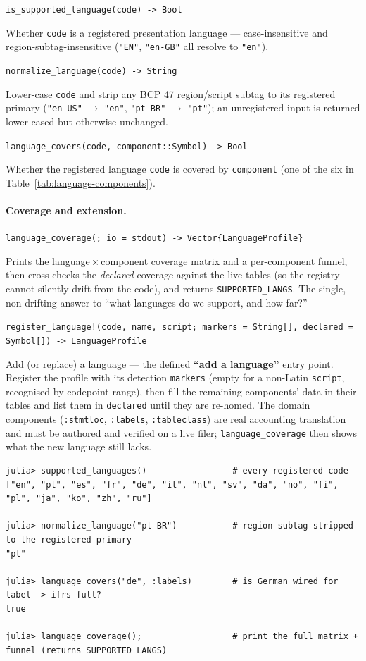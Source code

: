 \documentclass[11pt,a4paper]{report}
\newcommand{\sig}[1]{\medskip\noindent\texttt{#1}\par\medskip}
\begin{document}
\sig{is\_supported\_language(code) -> Bool}

\noindent Whether \texttt{code} is a registered presentation language --- case-insensitive and
region-subtag-insensitive (\texttt{"EN"}, \texttt{"en-GB"} all resolve to \texttt{"en"}).

\sig{normalize\_language(code) -> String}

\noindent Lower-case \texttt{code} and strip any BCP 47 region/script subtag to its registered primary
(\texttt{"en-US"} $\to$ \texttt{"en"}, \texttt{"pt\_BR"} $\to$ \texttt{"pt"}); an unregistered input is returned
lower-cased but otherwise unchanged.

\sig{language\_covers(code, component::Symbol) -> Bool}

\noindent Whether the registered language \texttt{code} is covered by \texttt{component} (one of the six in
Table~\ref{tab:language-components}).

\paragraph{Coverage and extension.}

\sig{language\_coverage(; io = stdout) -> Vector\{LanguageProfile\}}

\noindent Prints the language\,$\times$\,component coverage matrix and a per-component funnel, then cross-checks
the \emph{declared} coverage against the live tables (so the registry cannot silently drift from the code), and
returns \texttt{SUPPORTED\_LANGS}. The single, non-drifting answer to ``what languages do we support, and how
far?''

\sig{register\_language!(code, name, script; markers = String[], declared = Symbol[]) -> LanguageProfile}

\noindent Add (or replace) a language --- the defined \textbf{``add a language''} entry point. Register the
profile with its detection \texttt{markers} (empty for a non-Latin \texttt{script}, recognised by codepoint
range), then fill the remaining components' data in their tables and list them in \texttt{declared} until they
are re-homed. The domain components (\texttt{:stmtloc}, \texttt{:labels}, \texttt{:tableclass}) are real
accounting translation and must be authored and verified on a live filer; \texttt{language\_coverage} then
shows what the new language still lacks.

\begin{lstlisting}
julia> supported_languages()                 # every registered code
["en", "pt", "es", "fr", "de", "it", "nl", "sv", "da", "no", "fi", "pl", "ja", "ko", "zh", "ru"]

julia> normalize_language("pt-BR")           # region subtag stripped to the registered primary
"pt"

julia> language_covers("de", :labels)        # is German wired for label -> ifrs-full?
true

julia> language_coverage();                  # print the full matrix + funnel (returns SUPPORTED_LANGS)
\end{lstlisting}
\end{document}
